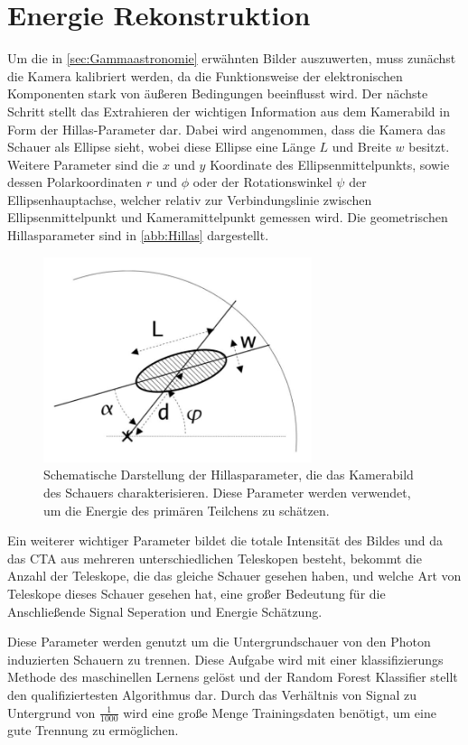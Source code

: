 \section{Energie Rekonstruktion}

Um die in \autoref{sec:Gammaastronomie} erwähnten Bilder auszuwerten, muss zunächst die Kamera kalibriert werden, da die Funktionsweise der elektronischen
Komponenten stark von äußeren Bedingungen beeinflusst wird.
Der nächste Schritt stellt das Extrahieren der wichtigen Information aus dem Kamerabild in Form der Hillas-Parameter dar.
Dabei wird angenommen, dass die Kamera das Schauer als Ellipse sieht, wobei diese Ellipse eine Länge $L$ und Breite $w$ besitzt.
Weitere Parameter sind die $x$ und $y$ Koordinate des Ellipsenmittelpunkts, sowie dessen Polarkoordinaten $r$ und $\phi$ oder der Rotationswinkel $\psi$
der Ellipsenhauptachse, welcher relativ zur Verbindungslinie zwischen Ellipsenmittelpunkt und Kameramittelpunkt gemessen wird.
Die geometrischen Hillasparameter sind in \autoref{abb:Hillas} dargestellt.
\begin{figure}
  \includegraphics[width=0.7\textwidth]{Plots/Hillas.JPG}
  \centering
  \caption{Schematische Darstellung der Hillasparameter, die das Kamerabild des Schauers charakterisieren. Diese Parameter
            werden verwendet, um die Energie des primären Teilchens zu schätzen.}
  \label{abb:Hillas}
\end{figure}
Ein weiterer wichtiger Parameter bildet die totale Intensität des Bildes und da das CTA aus mehreren unterschiedlichen Teleskopen besteht, bekommt die Anzahl
der Teleskope, die das gleiche Schauer gesehen haben, und welche Art von Teleskope dieses Schauer gesehen hat, eine großer Bedeutung für die Anschließende
Signal Seperation und Energie Schätzung.

Diese Parameter werden genutzt um die Untergrundschauer von den Photon induzierten Schauern zu trennen.
Diese Aufgabe wird mit einer klassifizierungs Methode des maschinellen Lernens gelöst und der
Random Forest Klassifier stellt den qualifiziertesten Algorithmus dar.
Durch das Verhältnis von Signal zu Untergrund von $\frac{1}{1000}$\cite{Cherenkov_Licht} wird eine große Menge Trainingsdaten
benötigt, um eine gute Trennung zu ermöglichen.

